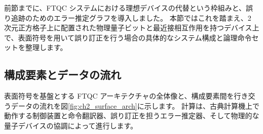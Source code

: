 前節までに、FTQC システムにおける理想デバイスの代替という枠組みと、誤り追跡のためのエラー推定グラフを導入しました。
本節ではこれを踏まえ、2 次元正方格子上に配置された物理量子ビットと最近接相互作用を持つデバイス上で、表面符号を用いて誤り訂正を行う場合の具体的なシステム構成と論理命令セットを整理します。

\subsection{構成要素とデータの流れ}

表面符号を基盤とする FTQC アーキテクチャの全体像と、構成要素間を行き交うデータの流れを図\ref{fig:ch2_surface_arch}に示します。
計算は、古典計算機上で動作する制御装置と命令翻訳器、誤り訂正を担うエラー推定器、そして物理的な量子デバイスの協調によって進行します。

